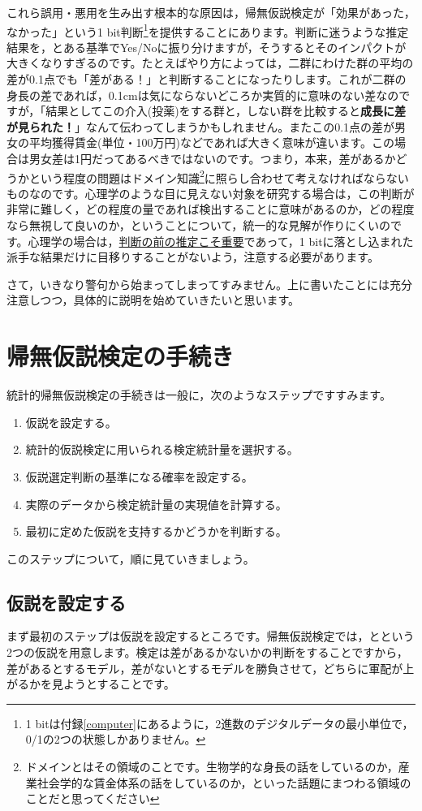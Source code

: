 \documentclass{ltjsbook}
\begin{document}
これら誤用・悪用を生み出す根本的な原因は，帰無仮説検定が「効果があった，なかった」という1 bit判断\footnote{1 bitは付録\ref{computer}にあるように，2進数のデジタルデータの最小単位で，0/1の2つの状態しかありません。}を提供することにあります。判断に迷うような推定結果を，とある基準でYes/Noに振り分けますが，そうするとそのインパクトが大きくなりすぎるのです。たとえばやり方によっては，二群にわけた群の平均の差が0.1点でも「差がある！」と判断することになったりします。これが二群の身長の差であれば，0.1cmは気にならないどころか実質的に意味のない差なのですが，「結果としてこの介入(投薬)をする群と，しない群を比較すると\textbf{成長に差が見られた！}」なんて伝わってしまうかもしれません。またこの0.1点の差が男女の平均獲得賃金(単位・100万円)などであれば大きく意味が違います。この場合は男女差は1円だってあるべきではないのです。つまり，本来，差があるかどうかという程度の問題はドメイン知識\footnote{ドメインとはその領域のことです。生物学的な身長の話をしているのか，産業社会学的な賃金体系の話をしているのか，といった話題にまつわる領域のことだと思ってください}に照らし合わせて考えなければならないものなのです。心理学のような目に見えない対象を研究する場合は，この判断が非常に難しく，どの程度の量であれば検出することに意味があるのか，どの程度なら無視して良いのか，ということについて，統一的な見解が作りにくいのです。心理学の場合は，\underline{判断の前の推定こそ重要}であって，1 bitに落とし込まれた派手な結果だけに目移りすることがないよう，注意する必要があります。


さて，いきなり警句から始まってしまってすみません。上に書いたことには充分注意しつつ，具体的に説明を始めていきたいと思います。

\section{帰無仮説検定の手続き}
\label{sec:13_02}
統計的帰無仮説検定の手続きは一般に，次のようなステップですすみます。
\begin{enumerate}
	\item 仮説を設定する。
	\item 統計的仮説検定に用いられる検定統計量を選択する。
	\item 仮説選定判断の基準になる確率を設定する。
	\item 実際のデータから検定統計量の実現値を計算する。
	\item 最初に定めた仮説を支持するかどうかを判断する。
\end{enumerate}

このステップについて，順に見ていきましょう。
\subsection{仮説を設定する}
まず最初のステップは仮説を設定するところです。帰無仮説検定では，とという2つの仮説を用意します。検定は差があるかないかの判断をすることですから，差があるとするモデル，差がないとするモデルを勝負させて，どちらに軍配が上がるかを見ようとすることです。
\end{document}
